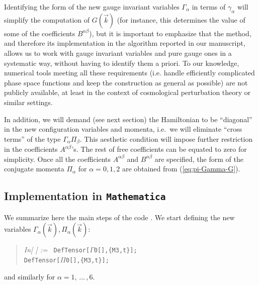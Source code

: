 \documentclass[11pt,tightenlines,eqsecnum,floats,aps,amsmath,amssymb,nofootinbib,prd,floatfix]{revtex4}
\def\v{\vec}
\newcommand{\<}{\langle}
\renewcommand{\>}{\rangle}
\newcounter{inout}
\newcommand{\inoutput}{%
	\stepcounter{inout}%
	\theinout}
\newcommand{\mathIn}[1]{
	\begin{quotation}\hspace*{-2.5cm} {\em In[\inoutput] :=\ } {\tt #1} \end{quotation}}
\begin{document}
Identifying the form of the new gauge invariant variables $\Gamma_{\alpha}$ in terms of $\gamma_{\alpha}$ will simplify the computation of $G(\v k)$ (for instance, this determines the value of some of the coefficients $B^{\alpha\beta}$), but it is important to emphasize that the method, and therefore its implementation in the algorithm reported in our manuscript, allows us to work with gauge invariant variables and pure gauge ones in a systematic way, without having to identify them a priori. To our knowledge, numerical tools meeting all these requirements (i.e. handle efficiently complicated phase space functions and keep the construction as general as possible) are not publicly available, at least in the context of cosmological perturbation theory or similar settings.

In addition, we will demand (see next section)  the Hamiltonian to be  ``diagonal'' in the new configuration variables and momenta, i.e.\ we will eliminate ``cross terms'' of the type  $\Gamma_{\alpha}\Pi_{\beta}$. This aesthetic condition will impose further restriction in the coefficients $A^{\alpha \beta}$'s.  The rest of free coefficients  can be equated to zero for simplicity. Once all the coefficients $A^{\alpha \beta}$ and $B^{\alpha \beta}$ are specified, the form of the conjugate momenta $\Pi_{\alpha}$ for $\alpha=0,1,2$ are obtained from (\ref{eq:pi-Gamma-G}).


\subsection{Implementation in {\tt Mathematica}}

We  summarize here the main steps of the code \cite{ntbk}. We start defining the new variables $\Gamma_{\alpha}(\vec k), \Pi_{\alpha}(\vec k)$:
%
\mathIn{DefTensor[$\Gamma$0[],\{M3,t\}];\\
DefTensor[$\Pi$0[],\{M3,t\}];}
%
and similarly for  $\alpha=1,\,\ldots\,,6$. 
\end{document}
